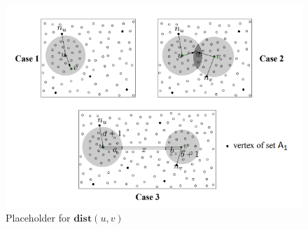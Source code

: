 \documentclass[shortabstract, lic, english]{iithesis}
\theoremstyle{definition} \newtheorem{definition}{Definition}[chapter]
\theoremstyle{remark} \newtheorem{remark}[definition]{Observation}
\theoremstyle{plain} \newtheorem{theorem}[definition]{Theorem}
\theoremstyle{plain} \newtheorem{lemma}[definition]{Lemma}
\theoremstyle{plain} \newtheorem{conjecture}[definition]{Conjecture}
\begin{document}
\begin{figure}[h]
    \includegraphics[width=14cm]{images/placeholder_distancequery}
    \centering
    \caption{Placeholder for $\mathbf{dist}(u, v)$}
\end{figure}
\end{document}
